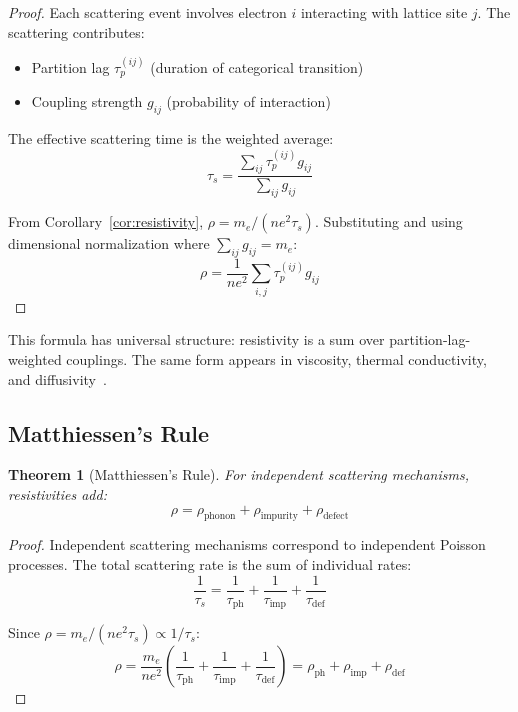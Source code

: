 \documentclass[twocolumn,showpacs,preprintnumbers,amsmath,amssymb,prd]{revtex4-2}
\newtheorem{theorem}{Theorem}[section]
\newcommand{\taup}{\tau_p}
\newcommand{\taus}{\tau_s}
\begin{document}
\begin{proof}
Each scattering event involves electron $i$ interacting with lattice site $j$. The scattering contributes:
\begin{itemize}
\item Partition lag $\taup^{(ij)}$ (duration of categorical transition)
\item Coupling strength $g_{ij}$ (probability of interaction)
\end{itemize}

The effective scattering time is the weighted average:
\begin{equation}
\taus = \frac{\sum_{ij} \taup^{(ij)} g_{ij}}{\sum_{ij} g_{ij}}
\label{eq:effective_tau}
\end{equation}

From Corollary~\ref{cor:resistivity}, $\rho = m_e/(ne^2\taus)$. Substituting and using dimensional normalization where $\sum_{ij} g_{ij} = m_e$:
\begin{equation}
\rho = \frac{1}{ne^2} \sum_{i,j} \taup^{(ij)} g_{ij}
\end{equation}
\end{proof}

This formula has universal structure: resistivity is a sum over partition-lag-weighted couplings. The same form appears in viscosity, thermal conductivity, and diffusivity~\cite{deGroot1984}.

\subsection{Matthiessen's Rule}

\begin{theorem}[Matthiessen's Rule]
\label{thm:matthiessen}
For independent scattering mechanisms, resistivities add:
\begin{equation}
\rho = \rho_{\text{phonon}} + \rho_{\text{impurity}} + \rho_{\text{defect}}
\label{eq:matthiessen}
\end{equation}
\end{theorem}

\begin{proof}
Independent scattering mechanisms correspond to independent Poisson processes. The total scattering rate is the sum of individual rates:
\begin{equation}
\frac{1}{\taus} = \frac{1}{\tau_{\text{ph}}} + \frac{1}{\tau_{\text{imp}}} + \frac{1}{\tau_{\text{def}}}
\label{eq:rate_addition}
\end{equation}

Since $\rho = m_e/(ne^2\taus) \propto 1/\taus$:
\begin{equation}
\rho = \frac{m_e}{ne^2}\left(\frac{1}{\tau_{\text{ph}}} + \frac{1}{\tau_{\text{imp}}} + \frac{1}{\tau_{\text{def}}}\right) = \rho_{\text{ph}} + \rho_{\text{imp}} + \rho_{\text{def}}
\end{equation}
\end{proof}
\end{document}
